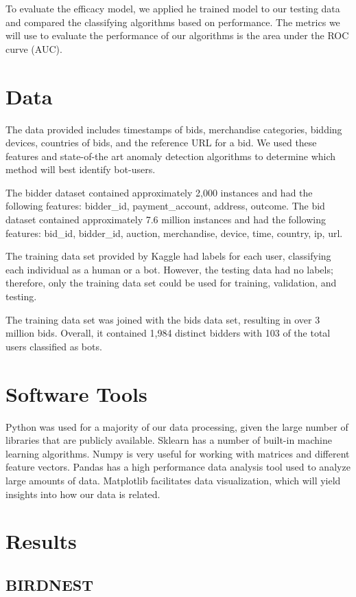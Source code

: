 \documentclass{article} %
\begin{document}
To evaluate the efficacy model, we applied he trained model to our testing data and compared the classifying algorithms based on performance.
The metrics we will use to evaluate the performance of our algorithms is the area under the ROC curve (AUC). 

\section{Data}

The data provided includes timestamps of bids, merchandise categories, bidding devices, countries of bids, and the reference URL for a bid.
We used these features and state-of-the art anomaly detection algorithms to determine which method will best identify bot-users.

The bidder dataset contained approximately 2,000 instances and had the following features: bidder\_id, payment\_account, address, outcome.
The bid dataset contained approximately 7.6 million instances and had the following features: bid\_id, bidder\_id, auction, merchandise, device, time, country, ip, url.

The training data set provided by Kaggle had labels for each user, classifying each individual as a human or a bot.
However, the testing data had no labels; therefore, only the training data set could be used for training, validation, and testing.

The training data set was joined with the bids data set, resulting in over 3 million bids.
Overall, it contained 1,984 distinct bidders with 103 of the total users classified as bots.

\section{Software Tools}

Python was used for a majority of our data processing, given the large number of libraries that are publicly available.
Sklearn has a number of built-in machine learning algorithms.
Numpy is very useful for working with matrices and different feature vectors.
Pandas has a high performance data analysis tool used to analyze large amounts of data.
Matplotlib facilitates data visualization, which will yield insights into how our data is related.


\section{Results}
\subsection{BIRDNEST}
\end{document}
